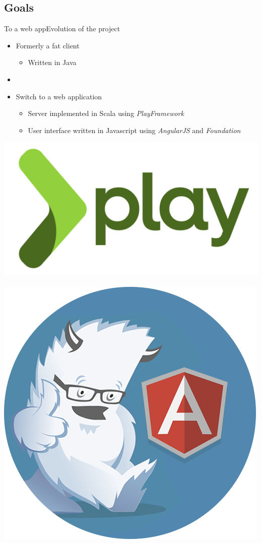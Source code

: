 \documentclass{beamer}
\begin{document}
\subsection{Goals}

\begin{frame}{To a web app}{Evolution of the project}
  \begin{itemize}
    \item {
      Formerly a fat client
      \begin{itemize}
        \item { Written in Java }
      \end{itemize}
      \pause
    }
    \item[~]
    \item {
      Switch to a web application
      \begin{itemize}
        \item { Server implemented in Scala using \emph{PlayFramework} }
        \item { User interface written in Javascript using \emph{AngularJS} and \emph{Foundation} }
      \end{itemize}
    }
  \end{itemize}
  \begin{center}
    \includegraphics[scale=0.05]{img/play-logo.png}
    ~
    \includegraphics[scale=0.1]{img/foundation-angular.png}

\end{center}
\end{frame}
\end{document}
